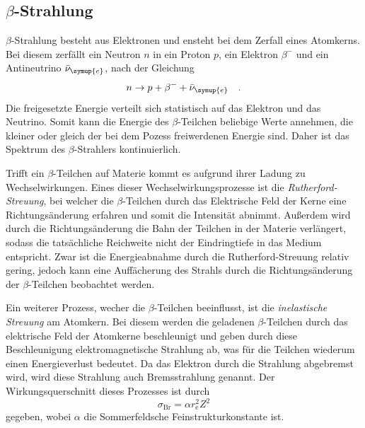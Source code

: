 \subsection{\texorpdfstring{$\beta$}{}-Strahlung}
$\beta$-Strahlung besteht aus Elektronen und ensteht bei dem Zerfall eines Atomkerns. Bei diesem zerfällt ein Neutron $n$ in ein
Proton $p$, ein Elektron $\beta^{-}$ und ein Antineutrino $\bar{\nu}_{\symup{e}}$, nach der Gleichung
\begin{equation}
n \rightarrow p+\beta^{-}+\bar{\nu}_{\symup{e}} \quad .
\end{equation}
Die freigesetzte Energie verteilt sich statistisch auf das Elektron und das Neutrino. Somit kann die Energie des $\beta$-Teilchen
beliebige Werte annehmen, die kleiner oder gleich der bei dem Pozess freiwerdenen Energie sind. Daher ist das Spektrum des $\beta$-Strahlers
kontinuierlich.

Trifft ein $\beta$-Teilchen auf Materie kommt es aufgrund ihrer Ladung zu Wechselwirkungen. Eines dieser Wechselwirkungsprozesse ist die
\textit{Rutherford-Streuung}, bei welcher die $\beta$-Teilchen durch das Elektrische Feld der Kerne eine Richtungsänderung erfahren und somit die Intensität abnimmt.
Außerdem wird durch die Richtungsänderung die Bahn der Teilchen in der Materie verlängert, sodass die tatsächliche Reichweite nicht der Eindringtiefe in das Medium entspricht.
Zwar ist die Energieabnahme durch die Rutherford-Streuung relativ gering, jedoch kann eine Auffächerung des Strahls durch die Richtungsänderung der $\beta$-Teilchen beobachtet werden.

Ein weiterer Prozess, wecher die $\beta$-Teilchen beeinflusst, ist die \textit{inelastische Streuung} am Atomkern. Bei diesem werden die geladenen $\beta$-Teilchen
durch das elektrische Feld der Atomkerne beschleunigt und geben durch diese Beschleunigung elektromagnetische Strahlung ab, was für die Teilchen wiederum einen Energieverlust bedeutet.
Da das Elektron durch die Strahlung abgebremst wird, wird diese Strahlung auch Bremsstrahlung genannt.
Der Wirkungsquerschnitt dieses Prozesses ist durch
\begin{equation}
\sigma_{\text{Br}}=\alpha r_{\text{e}}^2Z^2
\end{equation}
gegeben, wobei $\alpha$ die Sommerfeldsche Feinstrukturkonstante ist.


